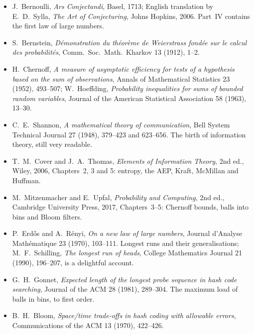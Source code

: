 \begin{itemize}
\item J.~Bernoulli, \emph{Ars Conjectandi}, Basel, 1713; English translation by E.~D.~Sylla, \emph{The Art of
Conjecturing}, Johns Hopkins, 2006. Part~IV contains the first law of large numbers.
\item S.~Bernstein, \emph{D\'emonstration du th\'eor\`eme de Weierstrass fond\'ee sur le calcul des probabilit\'es},
Comm.\ Soc.\ Math.\ Kharkov 13 (1912), 1--2.
\item H.~Chernoff, \emph{A measure of asymptotic efficiency for tests of a hypothesis based on the sum of
observations}, Annals of Mathematical Statistics 23 (1952), 493--507; W.~Hoeffding, \emph{Probability inequalities for
sums of bounded random variables}, Journal of the American Statistical Association 58 (1963), 13--30.
\item C.~E.~Shannon, \emph{A mathematical theory of communication}, Bell System Technical Journal 27 (1948), 379--423
and 623--656. The birth of information theory, still very readable.
\item T.~M.~Cover and J.~A.~Thomas, \emph{Elements of Information Theory}, 2nd ed., Wiley, 2006, Chapters~2, 3 and 5:
entropy, the AEP, Kraft, McMillan and Huffman.
\item M.~Mitzenmacher and E.~Upfal, \emph{Probability and Computing}, 2nd ed., Cambridge University Press, 2017,
Chapters~3--5: Chernoff bounds, balls into bins and Bloom filters.
\item P.~Erd\H{o}s and A.~R\'enyi, \emph{On a new law of large numbers}, Journal d'Analyse Math\'ematique 23 (1970),
103--111. Longest runs and their generalisations; M.~F.~Schilling, \emph{The longest run of heads}, College
Mathematics Journal 21 (1990), 196--207, is a delightful account.
\item G.~H.~Gonnet, \emph{Expected length of the longest probe sequence in hash code searching}, Journal of the ACM
28 (1981), 289--304. The maximum load of balls in bins, to first order.
\item B.~H.~Bloom, \emph{Space/time trade-offs in hash coding with allowable errors}, Communications of the ACM 13
(1970), 422--426.
\end{itemize}
